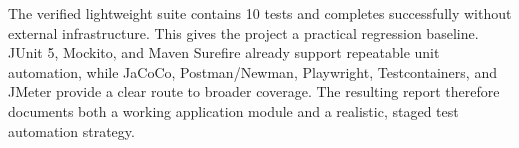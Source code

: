 \documentclass[11pt,a4paper]{article}
\begin{document}
The verified lightweight suite contains 10 tests and completes successfully without
external infrastructure. This gives the project a practical regression baseline.
JUnit 5, Mockito, and Maven Surefire already support repeatable unit automation, while
JaCoCo, Postman/Newman, Playwright, Testcontainers, and JMeter provide a clear route to
broader coverage. The resulting report therefore documents both a working application
module and a realistic, staged test automation strategy.
\end{document}
